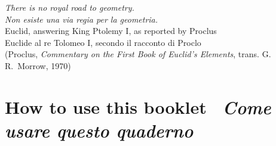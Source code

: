 \vspace*{\fill}
\begin{center}
\begin{minipage}{0.72\textwidth}
\raggedleft
{\large\itshape There is no royal road to geometry.}\\[2pt]
{\large\itshape\color{itgreen} Non esiste una via regia per la geometria.}\\[8pt]
{\small Euclid, answering King Ptolemy I, as reported by Proclus}\\
{\small\color{itgreen}Euclide al re Tolomeo I, secondo il racconto di Proclo}\\[2pt]
{\footnotesize\color{slate} (Proclus, \textit{Commentary on the First Book of Euclid's Elements}, trans. G.\,R.~Morrow, 1970)}
\end{minipage}
\end{center}
\vspace*{\fill}
\clearpage

\pagestyle{fancy}
\chapter*{How to use this booklet \textperiodcentered\ {\color{itgreen}\itshape Come usare questo quaderno}}

